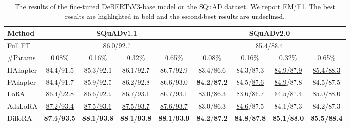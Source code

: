 \begin{table*}
  \centering
  \begin{tabular}{@{}l|cccc|cccc@{}}
    \toprule
    Method & \multicolumn{4}{c|}{SQuADv1.1} & \multicolumn{4}{c}{SQuADv2.0}\\
    
    \midrule
     Full FT &  \multicolumn{4}{c|}{86.0/92.7} &  \multicolumn{4}{c}{85.4/88.4}\\
     \midrule
    \#Params &0.08\% &0.16\%& 0.32\% & 0.65\% &0.08\% &0.16\%& 0.32\% & 0.65\%\\
    \midrule
    HAdapter&84.4/91.5&85.3/92.1&86.1/92.7& 86.7/92.9& 83.4/86.6& 84.3/87.3 & \underline{84.9/87.9} & \underline{85.4/88.3}\\
    PAdapter&84.4/91.7 &85.9/92.5&86.2/92.8& 86.6/93.0 &\textbf{84.2}/\textbf{87.2}& 84.5/\underline{87.6} & \underline{84.9}/87.8& 84.5/87.5\\
    LoRA&86.4/92.8 &86.6/92.9&86.7/93.1 &86.7/93.1&83.0/86.3 &83.6/86.7&84.5/87.4 &85.0/88.0\\
    AdaLoRA&\underline{87.2/93.4}& \underline{87.5/93.6}& \underline{87.5/93.7}& \underline{87.6/93.7} & 83.0/86.3& \underline{84.6}/87.5&84.1/87.3 &84.2/87.3\\
    \midrule
    \rowcolor{gray!20} DiffoRA &\textbf{87.6}/\textbf{93.5}&\textbf{88.1}/\textbf{93.8}& \textbf{88.1}/\textbf{93.8} & \textbf{88.1}/\textbf{93.9} & \textbf{84.2}/\textbf{87.2}&\textbf{84.8}/\textbf{87.8}&\textbf{85.1}/\textbf{88.0}&\textbf{85.5}\textbf{/88.4}\\
    \bottomrule
  \end{tabular}
  \caption{The results of the fine-tuned DeBERTaV3-base model on the SQuAD dataset. We report EM/F1. The best results are highlighted in bold and the second-best results are underlined.}
  \label{tab: qa}
\end{table*}


